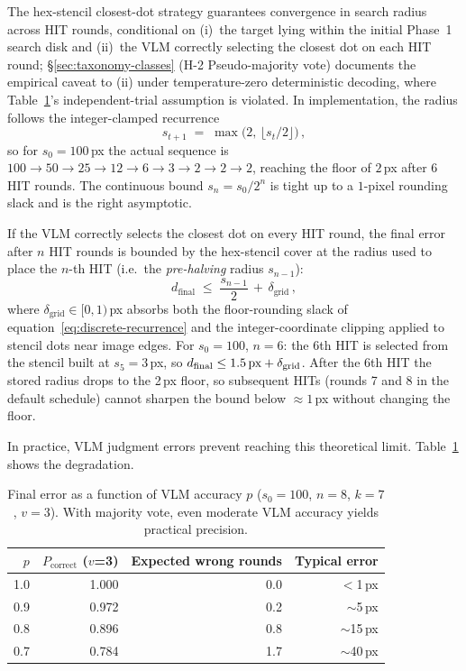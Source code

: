 \documentclass[sigconf,nonacm]{acmart}
\begin{document}
The hex-stencil closest-dot strategy guarantees convergence in search
radius across HIT rounds, conditional on (i)~the target lying within
the initial Phase~1 search disk and (ii)~the VLM correctly selecting
the closest dot on each HIT round; \S\ref{sec:taxonomy-classes}
(H-2 Pseudo-majority vote) documents the empirical caveat to (ii)
under temperature-zero deterministic decoding, where Table~\ref{tab:convergence-error}'s independent-trial assumption is violated.
In implementation, the radius follows the
integer-clamped recurrence
\begin{equation}
  s_{t+1} \;=\; \max\!\bigl(2,\, \lfloor s_t / 2 \rfloor\bigr)\,,
  \label{eq:discrete-recurrence}
\end{equation}
so for $s_0 = 100$\,px the actual sequence is $100 \to 50 \to 25 \to
12 \to 6 \to 3 \to 2 \to 2 \to 2$, reaching the floor of $2$\,px after
$6$ HIT rounds.  The continuous bound $s_n = s_0/2^n$ is tight up to a
$1$-pixel rounding slack and is the right asymptotic.

\begin{theorem}
\label{thm:convergence}
If the VLM correctly selects the closest dot on every HIT round, the
final error after $n$ HIT rounds is bounded by the hex-stencil cover
at the radius used to place the $n$-th HIT (i.e.\ the
\emph{pre-halving} radius $s_{n-1}$):
\begin{equation}
  d_{\text{final}} \;\leq\; \frac{s_{n-1}}{2} \,+\, \delta_{\text{grid}}\,,
  \label{eq:convergence-bound}
\end{equation}
where $\delta_{\text{grid}} \in [0, 1)$\,px absorbs both the
floor-rounding slack of equation~\eqref{eq:discrete-recurrence} and
the integer-coordinate clipping applied to stencil dots near image
edges.  For $s_0 = 100$, $n = 6$: the 6th HIT is selected from the
stencil built at $s_5 = 3$\,px, so
$d_{\text{final}} \leq 1.5\text{\,px} + \delta_{\text{grid}}$.  After
the 6th HIT the stored radius drops to the 2\,px floor, so
subsequent HITs (rounds 7 and 8 in the default schedule) cannot
sharpen the bound below $\approx 1$\,px without changing the floor.
\end{theorem}

In practice, VLM judgment errors prevent reaching this theoretical
limit.  Table~\ref{tab:convergence-error} shows the degradation.

\begin{table}[t]
\caption{Final error as a function of VLM accuracy $p$
  ($s_0 = 100$, $n = 8$, $k = 7$, $v = 3$).  With majority vote,
  even moderate VLM accuracy yields practical precision.}
\label{tab:convergence-error}
\begin{tabular}{rrrr}
\toprule
$p$ & $P_{\text{correct}}$ ($v$=3) & Expected wrong rounds & Typical error \\
\midrule
1.0 & 1.000 & 0.0 & $<$1\,px \\
0.9 & 0.972 & 0.2 & $\sim$5\,px \\
0.8 & 0.896 & 0.8 & $\sim$15\,px \\
0.7 & 0.784 & 1.7 & $\sim$40\,px \\
\bottomrule
\end{tabular}
\end{table}
\end{document}
